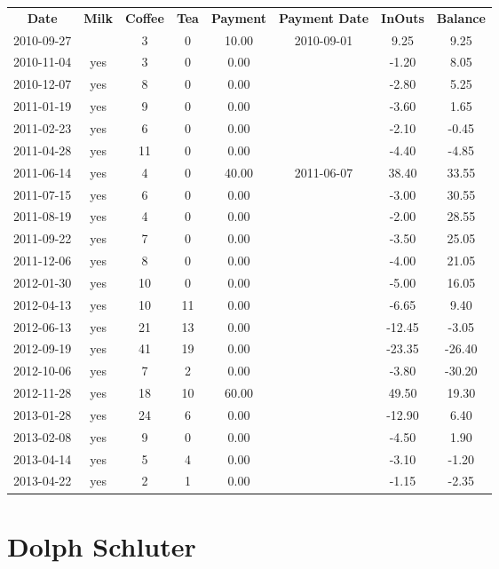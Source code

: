 \begin{center}
\begin{tabular}{cccccccc}
\textbf{Date} & \textbf{Milk} & \textbf{Coffee} & \textbf{Tea} & \textbf{Payment} & \textbf{Payment Date} & \textbf{InOuts} & \textbf{Balance} \\
2010-09-27 &  &  3 &  0 & 10.00 & 2010-09-01 &   9.25 &   9.25\\ 
2010-11-04 & yes &  3 &  0 &  0.00 &  &  -1.20 &   8.05\\ 
2010-12-07 & yes &  8 &  0 &  0.00 &  &  -2.80 &   5.25\\ 
2011-01-19 & yes &  9 &  0 &  0.00 &  &  -3.60 &   1.65\\ 
2011-02-23 & yes &  6 &  0 &  0.00 &  &  -2.10 &  -0.45\\ 
2011-04-28 & yes & 11 &  0 &  0.00 &  &  -4.40 &  -4.85\\ 
2011-06-14 & yes &  4 &  0 & 40.00 & 2011-06-07 &  38.40 &  33.55\\ 
2011-07-15 & yes &  6 &  0 &  0.00 &  &  -3.00 &  30.55\\ 
2011-08-19 & yes &  4 &  0 &  0.00 &  &  -2.00 &  28.55\\ 
2011-09-22 & yes &  7 &  0 &  0.00 &  &  -3.50 &  25.05\\ 
2011-12-06 & yes &  8 &  0 &  0.00 &  &  -4.00 &  21.05\\ 
2012-01-30 & yes & 10 &  0 &  0.00 &  &  -5.00 &  16.05\\ 
2012-04-13 & yes & 10 & 11 &  0.00 &  &  -6.65 &   9.40\\ 
2012-06-13 & yes & 21 & 13 &  0.00 &  & -12.45 &  -3.05\\ 
2012-09-19 & yes & 41 & 19 &  0.00 &  & -23.35 & -26.40\\ 
2012-10-06 & yes &  7 &  2 &  0.00 &  &  -3.80 & -30.20\\ 
2012-11-28 & yes & 18 & 10 & 60.00 &  &  49.50 &  19.30\\ 
2013-01-28 & yes & 24 &  6 &  0.00 &  & -12.90 &   6.40\\ 
2013-02-08 & yes &  9 &  0 &  0.00 &  &  -4.50 &   1.90\\ 
2013-04-14 & yes &  5 &  4 &  0.00 &  &  -3.10 &  -1.20\\ 
2013-04-22 & yes &  2 &  1 &  0.00 &  &  -1.15 &  -2.35
\end{tabular}
\end{center}

\section{Dolph Schluter}

